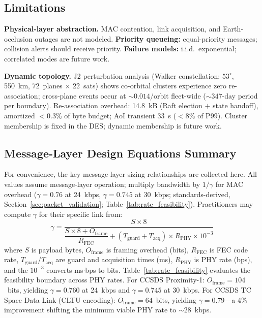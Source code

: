 \documentclass[journal]{IEEEtran}
\begin{document}
\subsection{Limitations}
\label{sec:limitations}

\textbf{Physical-layer abstraction.} MAC contention, link acquisition, and Earth-occlusion outages are not modeled. \textbf{Priority queueing:} equal-priority messages; collision alerts should receive priority. \textbf{Failure models:} i.i.d.\ exponential; correlated modes are future work.

\textbf{Dynamic topology.} J2 perturbation analysis (Walker constellation: $53^\circ$, 550~km, 72~planes $\times$ 22~sats) shows co-orbital clusters experience zero re-association; cross-plane events occur at ${\sim}0.014$/orbit fleet-wide (${\sim}347$-day period per boundary). Re-association overhead: 14.8~kB (Raft election $+$ state handoff), amortized $<$0.3\% of byte budget; AoI transient 33~s ($<$8\% of P99). Cluster membership is fixed in the DES; dynamic membership is future work.


\subsection{Message-Layer Design Equations Summary}

For convenience, the key message-layer sizing relationships are collected here. All values assume message-layer operation; multiply bandwidth by $1/\gamma$ for MAC overhead ($\gamma = 0.76$ at 24~kbps, $\gamma = 0.745$ at 30~kbps; standards-derived, Section~\ref{sec:packet_validation}; Table~\ref{tab:rate_feasibility}). Practitioners may compute $\gamma$ for their specific link from:
\begin{equation}
    \gamma = \frac{S \times 8}{\dfrac{S \times 8 + O_{\text{frame}}}{R_{\text{FEC}}} + (T_{\text{guard}} + T_{\text{acq}}) \times R_{\text{PHY}} \times 10^{-3}}
    \label{eq:gamma_general}
\end{equation}
\noindent where $S$ is payload bytes, $O_{\text{frame}}$ is framing overhead (bits), $R_{\text{FEC}}$ is FEC code rate, $T_{\text{guard}}$/$T_{\text{acq}}$ are guard and acquisition times (ms), $R_{\text{PHY}}$ is PHY rate (bps), and the $10^{-3}$ converts ms$\cdot$bps to bits. Table~\ref{tab:rate_feasibility} evaluates the feasibility boundary across PHY rates. For CCSDS Proximity-1: $O_{\text{frame}} = 104$~bits, yielding $\gamma = 0.760$ at 24~kbps and $\gamma = 0.745$ at 30~kbps. For CCSDS TC Space Data Link (CLTU encoding): $O_{\text{frame}} = 64$~bits, yielding $\gamma = 0.79$---a 4\% improvement shifting the minimum viable PHY rate to ${\sim}28$~kbps.
\end{document}
